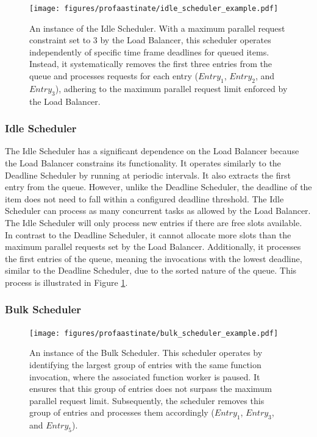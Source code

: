     \begin{figure}
        \centering
        \texttt{[image: figures/profaastinate/idle\_scheduler\_example.pdf]}
        \caption{An instance of the Idle Scheduler. With a maximum parallel request constraint set to 3 by the Load Balancer, this scheduler operates independently of specific time frame deadlines for queued items. Instead, it systematically removes the first three entries from the queue and processes requests for each entry ($Entry_1$, $Entry_2$, and $Entry_3$), adhering to the maximum parallel request limit enforced by the Load Balancer.}
        \label{fig:idle-scheduler-example}
    \end{figure}
    \subsubsection{Idle Scheduler}
\label{sec:idle-scheduler}
The Idle Scheduler has a significant dependence on the Load Balancer because the Load Balancer constrains its functionality. It operates similarly to the Deadline Scheduler by running at periodic intervals. It also extracts the first entry from the queue. However, unlike the Deadline Scheduler, the deadline of the item does not need to fall within a configured deadline threshold. The Idle Scheduler can process as many concurrent tasks as allowed by the Load Balancer. The Idle Scheduler will only process new entries if there are free slots available. In contrast to the Deadline Scheduler, it cannot allocate more slots than the maximum parallel requests set by the Load Balancer. Additionally, it processes the first entries of the queue, meaning the invocations with the lowest deadline, similar to the Deadline Scheduler, due to the sorted nature of the queue. This process is illustrated in Figure \ref{fig:idle-scheduler-example}.


    \subsubsection{Bulk Scheduler} 
\label{sec:bulk-scheduler}

    \begin{figure}
        \centering
        \texttt{[image: figures/profaastinate/bulk\_scheduler\_example.pdf]}
        \caption{An instance of the Bulk Scheduler. This scheduler operates by identifying the largest group of entries with the same function invocation, where the associated function worker is paused. It ensures that this group of entries does not surpass the maximum parallel request limit. Subsequently, the scheduler removes this group of entries and processes them accordingly ($Entry_1$, $Entry_3$, and $Entry_5$).}
        \label{fig:bulk-scheduler-example}
    \end{figure}

